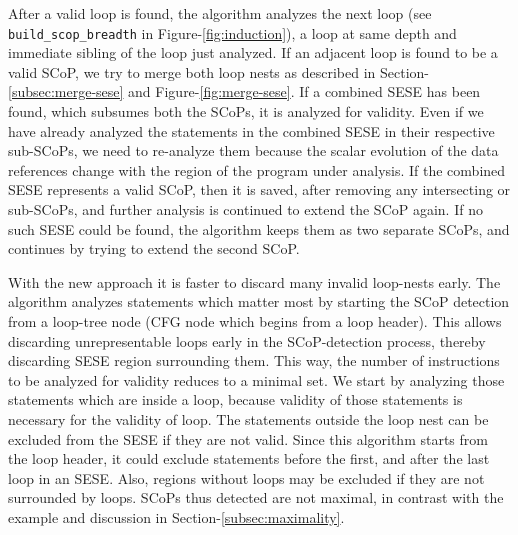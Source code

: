 \documentclass{sig-alternate}
\begin{document}
After a valid loop is found, the algorithm analyzes the next loop
(see \texttt{build\_scop\_breadth} in Figure-\ref{fig:induction}), a loop at
same depth and immediate sibling of the loop just analyzed.  If an adjacent loop
is found to be a valid SCoP, we try to merge both loop nests as described in
Section-\ref{subsec:merge-sese} and Figure-\ref{fig:merge-sese}.  If a combined
SESE has been found, which subsumes both the SCoPs, it is analyzed for
validity. Even if we have already analyzed the statements in the combined SESE
in their respective sub-SCoPs, we need to re-analyze them because the scalar
evolution of the data references change with the region of the program under
analysis. If the combined SESE represents a valid SCoP, then it is saved, after
removing any intersecting or sub-SCoPs, and further analysis is continued to
extend the SCoP again.  If no such SESE could be found, the algorithm keeps them
as two separate SCoPs, and continues by trying to extend the second SCoP.

With the new approach it is faster to discard many invalid loop-nests early. The
algorithm analyzes statements which matter most by starting the SCoP detection
from a loop-tree node (CFG node which begins from a loop header). This allows
discarding unrepresentable loops early in the SCoP-detection process, thereby
discarding SESE region surrounding them.  This way, the number of instructions
to be analyzed for validity reduces to a minimal set.  We start by analyzing
those statements which are inside a loop, because validity of those statements
is necessary for the validity of loop.  The statements outside the loop nest can
be excluded from the SESE if they are not valid.  Since this algorithm starts
from the loop header, it could exclude statements before the first, and after
the last loop in an SESE.  Also, regions without loops may be excluded if they
are not surrounded by loops.  SCoPs thus detected are not maximal, in contrast
with the example and discussion in Section-\ref{subsec:maximality}.


\end{document}
